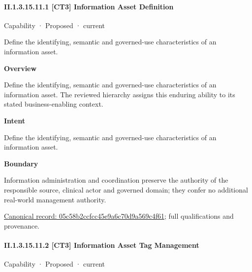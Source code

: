 \paragraph*{II.1.3.15.11.1 [CT3] Information Asset Definition}
\label{navigation:II.1.3.15.11.1}

\label{element:05c58b2ccfcc45e9a6c70d9a569c4f61}
{\small Capability · Proposed · current}\par

Define the identifying, semantic and governed-use characteristics of an information asset.



\textbf{Overview}



Define the identifying, semantic and governed-use characteristics of an information asset. The reviewed hierarchy assigns this enduring ability to its stated business-enabling context.



\textbf{Intent}



Define the identifying, semantic and governed-use characteristics of an information asset.



\textbf{Boundary}



Information administration and coordination preserve the authority of the responsible source, clinical actor and governed domain; they confer no additional real-world management authority.


{\footnotesize \href{../../../../continuum/strategy/capability/05c58b2ccfcc45e9a6c70d9a569c4f61.md}{Canonical record: 05c58b2ccfcc45e9a6c70d9a569c4f61}; full qualifications and provenance.}\par
\paragraph*{II.1.3.15.11.2 [CT3] Information Asset Tag Management}
\label{navigation:II.1.3.15.11.2}

\label{element:df27c3ba6e164e56af7bff4e1eb1954a}
{\small Capability · Proposed · current}\par


